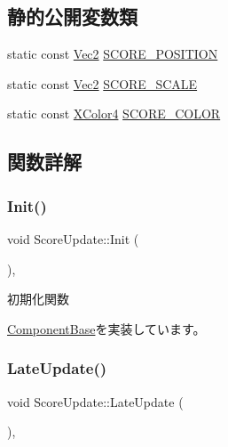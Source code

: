 \subsection*{静的公開変数類}
\begin{DoxyCompactItemize}
\item 
static const \mbox{\hyperlink{_vector3_d_8h_a5ef6e95dfc5f9d3820b71772d99bbc25}{Vec2}} \mbox{\hyperlink{class_score_update_a88bd91fc66dd629a849ab9f0a178150c}{S\+C\+O\+R\+E\+\_\+\+P\+O\+S\+I\+T\+I\+ON}}
\item 
static const \mbox{\hyperlink{_vector3_d_8h_a5ef6e95dfc5f9d3820b71772d99bbc25}{Vec2}} \mbox{\hyperlink{class_score_update_a23e9b8c4c6624cf5f3b66258771b3243}{S\+C\+O\+R\+E\+\_\+\+S\+C\+A\+LE}}
\item 
static const \mbox{\hyperlink{_vector3_d_8h_a680c30c4a07d86fe763c7e01169cd6cc}{X\+Color4}} \mbox{\hyperlink{class_score_update_ab78fc9ad68faf9f5be01096b5d60959e}{S\+C\+O\+R\+E\+\_\+\+C\+O\+L\+OR}}
\end{DoxyCompactItemize}


\subsection{関数詳解}
\mbox{\label{class_score_update_afd51e11ad00ebc15d9b3139398437afc}} 
\subsubsection{\texorpdfstring{Init()}{Init()}}
{\footnotesize\ttfamily void Score\+Update\+::\+Init (\begin{DoxyParamCaption}{ }\end{DoxyParamCaption})\hspace{0.3cm}{\ttfamily [override]}, {\ttfamily [virtual]}}



初期化関数 



\mbox{\hyperlink{class_component_base_a125939d6befe42f28886a6523e86b18b}{Component\+Base}}を実装しています。

\mbox{\label{class_score_update_adc9a48f54828e49c072c298777935893}} 
\subsubsection{\texorpdfstring{Late\+Update()}{LateUpdate()}}
{\footnotesize\ttfamily void Score\+Update\+::\+Late\+Update (\begin{DoxyParamCaption}{ }\end{DoxyParamCaption})\hspace{0.3cm}{\ttfamily [override]}, {\ttfamily [virtual]}}



